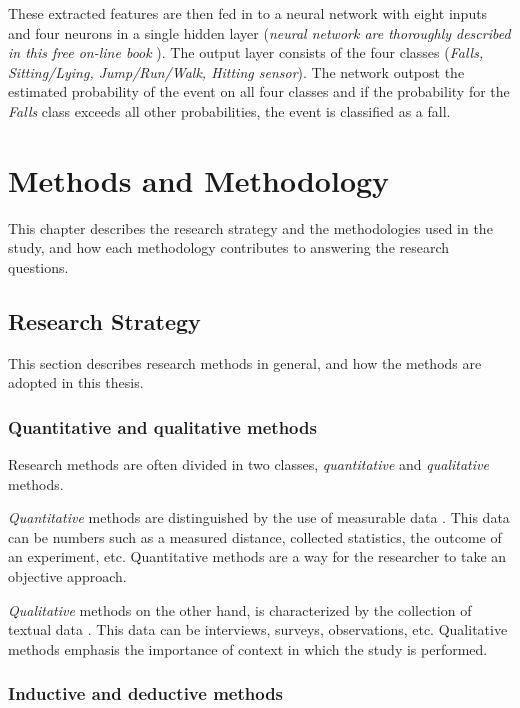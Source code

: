 \documentclass[12pt, a4paper, onecolumn]{article}
\begin{document}
	These extracted features are then fed in to a neural network with eight inputs and four neurons in a single hidden layer (\textit{neural network are thoroughly described in this free on-line book}  \cite{neural_networks}). The output layer consists of the four classes (\textit{Falls, Sitting/Lying, Jump/Run/Walk, Hitting sensor}). The network outpost the estimated probability of the event on all four classes and if the probability for the \textit{Falls}  class exceeds all other probabilities, the event is classified as a fall.
	
	
	\newpage
	\section{Methods and Methodology}
	
	This chapter describes the research strategy and the methodologies used in the study, and how each methodology contributes to answering the research questions.
	
	\subsection{Research Strategy}
	
	This section describes research methods in general, and how the methods are adopted in this thesis.
	
	\subsubsection{Quantitative and qualitative methods}
	
	Research methods are often divided in two classes, \textit{quantitative} and \textit{qualitative} methods.
	
	\textit{Quantitative} methods are distinguished by the use of measurable data \cite[p~54]{borrego}. This data can be numbers such as a measured distance, collected statistics, the outcome of an experiment, etc. Quantitative methods are a way for the researcher to take an objective approach.
	
	\textit{Qualitative} methods on the other hand, is characterized by the collection of textual data \cite[p~55]{borrego}. This data can be interviews, surveys, observations, etc. Qualitative methods emphasis the importance of context in which the study is performed.
	
	\subsubsection{Inductive and deductive methods}
	
\end{document}

